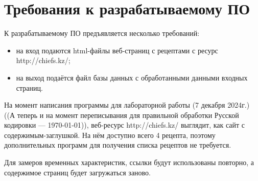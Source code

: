 \chapter{Требования к разрабатываемому ПО}

К разрабатываемому ПО предъявляется несколько требований:
\begin{itemize}
    \item на вход подаются html-файлы веб-страниц с рецептами с ресурс http://chiefs.kz/;
    \item на выход подаётся файл базы данных с обработанными данными входных страниц.
\end{itemize}

На момент написания программы для лабораторной работы (7 декабря 2024г.) ((А теперь и на момент переписывания для правильной обработки Русской кодировки --- \today)), веб-ресурс http://chiefs.kz/ выглядит, как сайт с содержимым-заглушкой. На нём доступно всего 4 рецепта, поэтому дополнительных программ для получения списка рецептов не требуется.

Для замеров временных характеристик, ссылки будут использованы повторно, а содержимое страниц будет загружаться заново.
